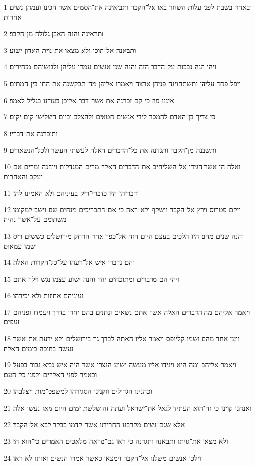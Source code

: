\par 1 ובאחד בשבת לפני עלות השחר באו אל־הקבר ותביאינה את־הסמים אשר הכינו ועמהן נשים אחרות׃
\par 2 ותראינה והנה האבן גלולה מן־הקבר׃
\par 3 ותבאנה אל־תוכו ולא מצאו את־גוית האדון ישוע׃
\par 4 ויהי הנה נבכות על־הדבר הזה והנה שני אנשים עמדו עליהן ולבושיהם מזהירים׃
\par 5 ויפל פחד עליהן ותשתחוינה פניהן ארצה ויאמרו אליהן מה־תבקשנה את־החי בין המתים׃
\par 6 איננו פה כי קם זכרנה את אשר־דבר אליכן בעודנו בגליל לאמר׃
\par 7 כי צריך בן־האדם להמסר לידי אנשים חטאים ולהצלב וביום השלישי קום יקום׃
\par 8 ותזכרנה את־דבריו׃
\par 9 ותשבנה מן־הקבר ותגדנה את כל־הדברים האלה לעשתי העשר ולכל־הנשארים׃
\par 10 ואלה הן אשר הגידו אל־השליחים את־הדברים האלה מרים המגדלית ויוחנה ומרים אם יעקב והאחרות׃
\par 11 ודבריהן היו כדברי־ריק בעיניהם ולא האמינו להן׃
\par 12 ויקם פטרוס וירץ אל־הקבר וישקף ולא־ראה כי אם־התכריכים מנחים שם וישב למקומו משתומם על־אשר נהיה׃
\par 13 והנה שנים מהם היו הלכים בעצם היום הזה אל־כפר אחד הרחק מירושלים כששים ריס ושמו עמאוס׃
\par 14 והם נדברו איש אל־רעהו על־כל־הקרות האלה׃
\par 15 ויהי הם מדברים ומתוכחים יחד והנה ישוע עצמו נגש וילך אתם׃
\par 16 ועיניהם אחוזות ולא יכירהו׃
\par 17 ויאמר אליהם מה הדברים האלה אשר אתם נשאים ונתנים בהם יחדו בדרך ויעמדו ופניהם זעפים׃
\par 18 ויען אחד מהם ושמו קליופס ויאמר אליו האתה לבדך גר בירושלים ולא ידעת את־אשר נעשה בתוכה בימים האלה׃
\par 19 ויאמר אליהם ומה היא ויגידו אליו מעשה ישוע הנצרי אשר היה איש נביא גבור בפעל ובאמר לפני האלהים ולפני כל־העם׃
\par 20 וכהנינו הגדולים וזקנינו הסגירהו למשפט־מות ויצלבהו׃
\par 21 ואנחנו קוינו כי זה־הוא העתיד לגאל את־ישראל ועתה זה שלשת ימים היום מאז נעשו אלה׃
\par 22 אלא שגם־נשים מקרבנו החרידנו אשר־קדמו בבקר לבא אל־הקבר׃
\par 23 ולא מצאו את־גויתו ותבאנה ותגדנה כי ראו גם־מראה מלאכים האמרים כי־הוא חי׃
\par 24 וילכו אנשים משלנו אל־הקבר וימצאו כאשר אמרו הנשים ואותו לא ראו׃
